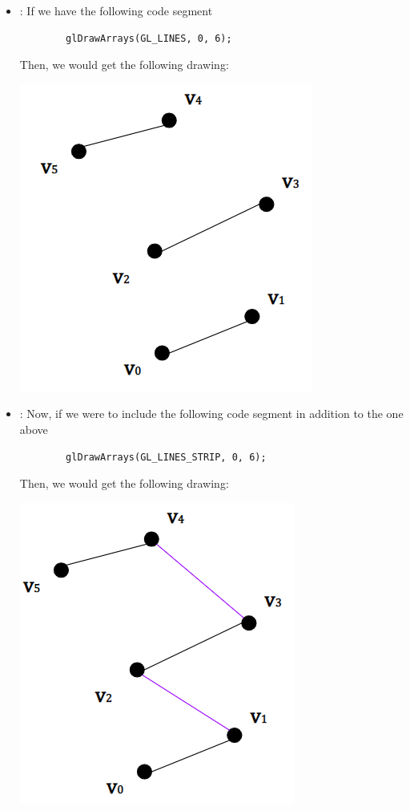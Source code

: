 \documentclass[letterpaper]{article}
\begin{document}
\begin{itemize}
    \item {}: If we have the following code segment
    \begin{verbatim}
        glDrawArrays(GL_LINES, 0, 6);\end{verbatim}
    Then, we would get the following drawing:
    \begin{center}
        \includegraphics[scale=0.5]{../assets/points3.png}
    \end{center}

    \item {}: Now, if we were to include the following code segment in addition to the one above
    \begin{verbatim}
        glDrawArrays(GL_LINES_STRIP, 0, 6);\end{verbatim}
    Then, we would get the following drawing: 
    \begin{center}
        \includegraphics[scale=0.5]{../assets/points4.png}
    \end{center}


\end{itemize}
\end{document}
